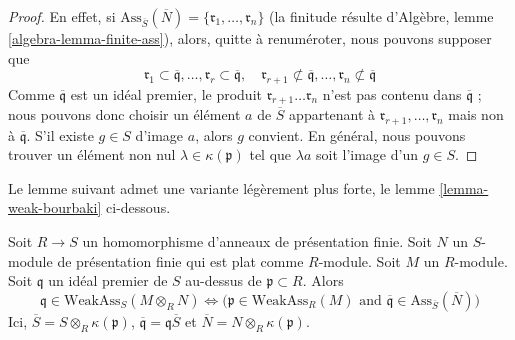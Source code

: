 \begin{proof}
En effet, si $\text{Ass}_{\overline{S}}(\overline{N}) =
\{\mathfrak r_1, \ldots, \mathfrak r_n\}$
(la finitude résulte d'Algèbre, lemme \ref{algebra-lemma-finite-ass}),
alors, quitte à renuméroter, nous pouvons supposer que
$$
\mathfrak r_1 \subset \overline{\mathfrak q},
\ldots,
\mathfrak r_r \subset \overline{\mathfrak q}, \quad
\mathfrak r_{r + 1} \not \subset \overline{\mathfrak q},
\ldots,
\mathfrak r_n \not \subset \overline{\mathfrak q}
$$
Comme $\overline{\mathfrak q}$ est un idéal premier, le produit
$\mathfrak r_{r + 1} \ldots \mathfrak r_n$ n'est pas contenu dans
$\overline{\mathfrak q}$ ; nous pouvons donc choisir un élément
$a$ de $\overline{S}$ appartenant à
$\mathfrak r_{r + 1}, \ldots, \mathfrak r_n$ mais non à
$\overline{\mathfrak q}$.
S'il existe $g \in S$ d'image $a$, alors $g$
convient. En général, nous pouvons trouver un élément non nul
$\lambda \in \kappa(\mathfrak p)$
tel que $\lambda a$ soit l'image d'un $g \in S$.
\end{proof}

\noindent
Le lemme suivant admet une variante légèrement plus forte,
le lemme \ref{lemma-weak-bourbaki}
ci-dessous.

\begin{lemma}
\label{lemma-weak-bourbaki-pre}
Soit $R \to S$ un homomorphisme d'anneaux de présentation finie.
Soit $N$ un $S$-module de présentation finie
qui est plat comme $R$-module. Soit $M$ un $R$-module.
Soit $\mathfrak q$ un idéal premier de $S$ au-dessus de $\mathfrak p \subset R$.
Alors
$$
\mathfrak q \in \text{WeakAss}_S(M \otimes_R N)
\Leftrightarrow
\Big(
\mathfrak p \in \text{WeakAss}_R(M)
\text{ and }
\overline{\mathfrak q} \in \text{Ass}_{\overline{S}}(\overline{N})
\Big)
$$
Ici, $\overline{S} = S \otimes_R \kappa(\mathfrak p)$,
$\overline{\mathfrak q} = \mathfrak q \overline{S}$ et
$\overline{N} = N \otimes_R \kappa(\mathfrak p)$.
\end{lemma}


